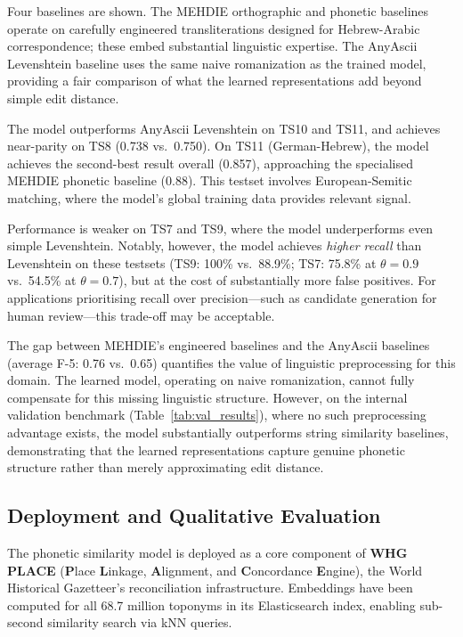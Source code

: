\documentclass[11pt]{article}
\begin{document}
    Four baselines are shown. The MEHDIE orthographic and phonetic baselines operate
    on carefully engineered transliterations designed for Hebrew-Arabic correspondence;
    these embed substantial linguistic expertise. The AnyAscii Levenshtein baseline
    uses the same naive romanization as the trained model, providing a fair comparison
    of what the learned representations add beyond simple edit distance.

    The model outperforms AnyAscii Levenshtein on TS10 and TS11, and achieves near-parity
    on TS8 (0.738 vs.\ 0.750). On TS11 (German-Hebrew), the model achieves the second-best
    result overall (0.857), approaching the specialised MEHDIE phonetic baseline (0.88).
    This testset involves European-Semitic matching, where the model's global training
    data provides relevant signal.

    Performance is weaker on TS7 and TS9, where the model underperforms even simple
    Levenshtein. Notably, however, the model achieves \emph{higher recall} than
    Levenshtein on these testsets (TS9: 100\% vs.\ 88.9\%; TS7: 75.8\% at $\theta=0.9$
    vs.\ 54.5\% at $\theta=0.7$), but at the cost of substantially more false positives.
    For applications prioritising recall over precision---such as candidate generation
    for human review---this trade-off may be acceptable.

    The gap between MEHDIE's engineered baselines and the AnyAscii baselines
    (average F-5: 0.76 vs.\ 0.65) quantifies the value of linguistic preprocessing
    for this domain. The learned model, operating on naive romanization, cannot fully
    compensate for this missing linguistic structure. However, on the internal
    validation benchmark (Table~\ref{tab:val_results}), where no such preprocessing
    advantage exists, the model substantially outperforms string similarity baselines,
    demonstrating that the learned representations capture genuine phonetic structure
    rather than merely approximating edit distance.

    \subsection{Deployment and Qualitative Evaluation}

    The phonetic similarity model is deployed as a core component of
    \textbf{WHG PLACE} (\textbf{P}lace \textbf{L}inkage, \textbf{A}lignment,
    and \textbf{C}oncordance \textbf{E}ngine), the World Historical Gazetteer's
    reconciliation infrastructure. Embeddings have been computed for all 68.7
    million toponyms in its Elasticsearch index, enabling sub-second
    similarity search via kNN queries.
\end{document}
